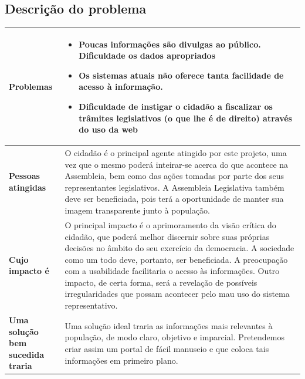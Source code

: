 \documentclass[12pt, a4paper]{article}
\begin{document}
        \subsection{Descrição do problema}
            \begin{longtabu}{X[-1] | X}
                \hline

                \textbf{Problemas} &
                \begin{minipage}[t]{\linewidth}
                \begin{itemize}[itemsep=.5ex,parsep=.0ex,after=\strut]
                \item Poucas informações são divulgas ao público. Dificuldade os dados apropriados
                \item Os sistemas atuais não oferece tanta facilidade de acesso à informação. 
                \item Dificuldade de instigar o cidadão a fiscalizar os trâmites legislativos
                    (o que lhe é de direito) através do uso da web
                \end{itemize}
                \end{minipage}
                \\ \hline

                \textbf{Pessoas atingidas} &
                O cidadão é o principal agente atingido por este projeto, uma
                vez que o mesmo poderá inteirar-se acerca do que acontece na
                Assembleia, bem como das ações tomadas por parte dos seus
                representantes legislativos. A Assembleia Legislativa também
                deve ser beneficiada, pois terá a oportunidade de manter sua
                imagem transparente junto à população.
                \\ \hline

                \textbf{Cujo impacto é} &
                O principal impacto é o aprimoramento da visão crítica do
                cidadão, que poderá melhor discernir sobre suas próprias
                decisões no âmbito do seu exercício da democracia. A sociedade
                como um todo deve, portanto, ser beneficiada. A preocupação com
                a usabilidade facilitaria o acesso às informações.  Outro
                impacto, de certa forma, será a revelação de possíveis
                irregularidades que possam acontecer pelo mau uso do sistema
                representativo.
                \\ \hline

                \textbf{Uma solução \newline bem sucedida traria} &
                Uma solução ideal traria as informações mais relevantes à
                população, de modo claro, objetivo e imparcial. Pretendemos
                criar assim um portal de fácil manuseio e que coloca tais
                informações em primeiro plano.
                \\ \hline

            \end{longtabu}
\end{document}
